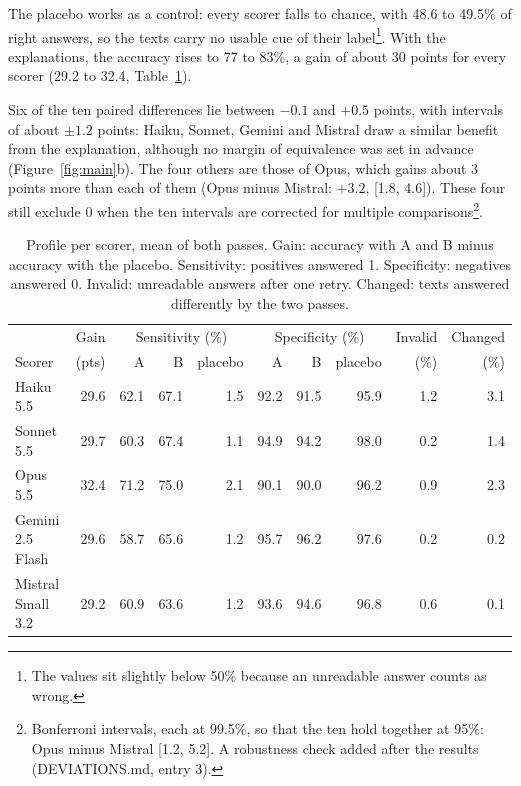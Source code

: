 \documentclass[10pt]{article}
\begin{document}
The placebo works as a control: every scorer falls to chance, with 48.6 to 49.5\% of
right answers, so the texts carry no usable cue of their label\footnote{The values sit
slightly below 50\% because an unreadable answer counts as wrong.}. With the
explanations, the accuracy rises to 77 to 83\%, a gain of about 30 points for every
scorer (29.2 to 32.4, Table~\ref{tab:profile}).

Six of the ten paired differences lie between $-0.1$ and $+0.5$ points, with intervals of
about $\pm1.2$ points: Haiku, Sonnet, Gemini and Mistral draw a similar benefit from the
explanation, although no margin of equivalence was set in advance
(Figure~\ref{fig:main}b). The four others are those of Opus, which gains about 3 points
more than each of them (Opus minus Mistral: $+3.2$, [1.8, 4.6]). These four still exclude
0 when the ten intervals are corrected for multiple comparisons\footnote{Bonferroni
intervals, each at 99.5\%, so that the ten hold together at 95\%: Opus minus Mistral
[1.2, 5.2]. A robustness check added after the results (DEVIATIONS.md, entry 3).}.

\begin{table}[h]
\centering
\footnotesize
\begin{tabular}{lrrrrrrrrr}
\toprule
& Gain & \multicolumn{3}{c}{Sensitivity (\%)} & \multicolumn{3}{c}{Specificity (\%)} & Invalid & Changed \\
\cmidrule(lr){3-5}\cmidrule(lr){6-8}
Scorer & (pts) & A & B & placebo & A & B & placebo & (\%) & (\%) \\
\midrule
Haiku 5.5 & 29.6 & 62.1 & 67.1 & 1.5 & 92.2 & 91.5 & 95.9 & 1.2 & 3.1 \\
Sonnet 5.5 & 29.7 & 60.3 & 67.4 & 1.1 & 94.9 & 94.2 & 98.0 & 0.2 & 1.4 \\
Opus 5.5 & 32.4 & 71.2 & 75.0 & 2.1 & 90.1 & 90.0 & 96.2 & 0.9 & 2.3 \\
Gemini 2.5 Flash & 29.6 & 58.7 & 65.6 & 1.2 & 95.7 & 96.2 & 97.6 & 0.2 & 0.2 \\
Mistral Small 3.2 & 29.2 & 60.9 & 63.6 & 1.2 & 93.6 & 94.6 & 96.8 & 0.6 & 0.1 \\
\bottomrule
\end{tabular}
\caption{Profile per scorer, mean of both passes. Gain: accuracy with A and B minus
accuracy with the placebo. Sensitivity: positives answered 1. Specificity: negatives
answered 0. Invalid: unreadable answers after one retry. Changed: texts answered
differently by the two passes.}
\label{tab:profile}
\end{table}
\end{document}
